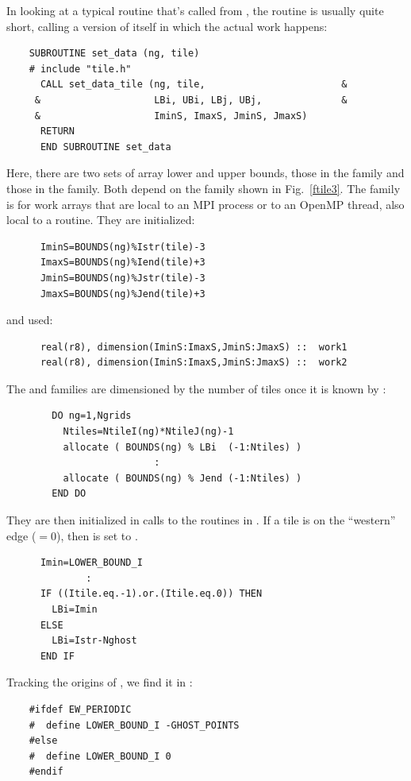 In looking at a typical routine that's called from ,
the routine is usually quite short, calling a 
version of itself in which the actual work happens:
\begin{verbatim}
    SUBROUTINE set_data (ng, tile)
    # include "tile.h"
      CALL set_data_tile (ng, tile,                        &
     &                    LBi, UBi, LBj, UBj,              &
     &                    IminS, ImaxS, JminS, JmaxS)
      RETURN
      END SUBROUTINE set_data
\end{verbatim}
Here, there are two sets of array lower and upper bounds, those
in the  family and those in the  family. Both
depend on the  family shown in Fig.\ \ref{ftile3}. The
 family is for work arrays that are local to an MPI
process or to an OpenMP thread, also local to a 
routine. They are initialized:
\begin{verbatim}
      IminS=BOUNDS(ng)%Istr(tile)-3
      ImaxS=BOUNDS(ng)%Iend(tile)+3
      JminS=BOUNDS(ng)%Jstr(tile)-3
      JmaxS=BOUNDS(ng)%Jend(tile)+3
\end{verbatim}
and used:
\begin{verbatim}
      real(r8), dimension(IminS:ImaxS,JminS:JmaxS) ::  work1
      real(r8), dimension(IminS:ImaxS,JminS:JmaxS) ::  work2
\end{verbatim}
The  and  families are dimensioned by the number
of tiles once it is known by :
\begin{verbatim}
        DO ng=1,Ngrids
          Ntiles=NtileI(ng)*NtileJ(ng)-1
          allocate ( BOUNDS(ng) % LBi  (-1:Ntiles) )
                          :
          allocate ( BOUNDS(ng) % Jend (-1:Ntiles) )
        END DO
\end{verbatim}
They are then initialized in calls to the routines in
. If a tile is on the ``western'' edge
($=0$), then  is set to .
\begin{verbatim}
      Imin=LOWER_BOUND_I
              :
      IF ((Itile.eq.-1).or.(Itile.eq.0)) THEN
        LBi=Imin
      ELSE
        LBi=Istr-Nghost
      END IF
\end{verbatim}
Tracking the origins of , we find it in
:
\begin{verbatim}
    #ifdef EW_PERIODIC
    #  define LOWER_BOUND_I -GHOST_POINTS
    #else
    #  define LOWER_BOUND_I 0
    #endif
\end{verbatim}

